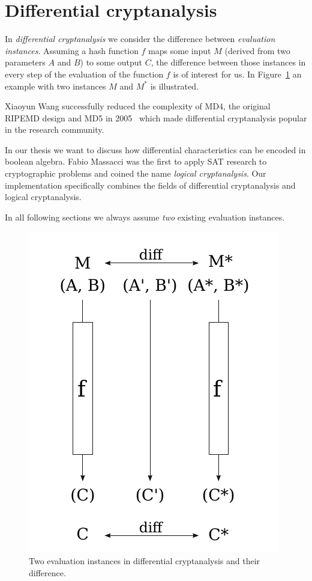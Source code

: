 \section{Differential cryptanalysis}
\label{sec:differential}
%
In \emph{differential cryptanalysis} we consider the difference between \emph{evaluation instances}. Assuming a hash function $f$ maps some input $M$ (derived from two parameters $A$ and $B$) to some output $C$, the difference between those instances in every step of the evaluation of the function $f$ is of interest for us. In Figure~\ref{fig:diff_cryptanalysis} an example with two instances $M$ and $M^*$ is illustrated.

Xiaoyun Wang successfully reduced the complexity of MD4, the original RIPEMD design and MD5 in 2005~\cite{Cry10} which made differential cryptanalysis popular in the research community.

In our thesis we want to discuss how differential characteristics can be encoded in boolean algebra. Fabio Massacci was the first to apply SAT research to cryptographic problems and coined the name \emph{logical cryptanalysis}. Our implementation specifically combines the fields of differential cryptanalysis and logical cryptanalysis.

In all following sections we always assume \emph{two} existing evaluation instances.
%
\begin{figure}[h]
  \begin{center}
    \includegraphics{img/diff_cryptanalysis.pdf}
    \caption{Two evaluation instances in differential cryptanalysis and their difference.}
    \label{fig:diff_cryptanalysis}
  \end{center}
\end{figure}

